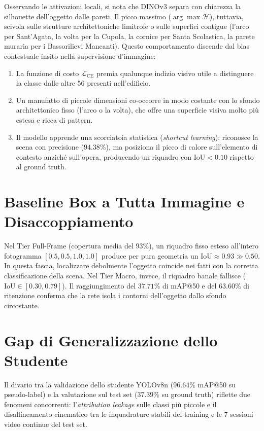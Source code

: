 Osservando le attivazioni locali, si nota che DINOv3 separa con chiarezza la silhouette dell'oggetto dalle pareti. Il picco massimo ($\arg\max \mathcal{H}$), tuttavia, scivola sulle strutture architettoniche limitrofe o sulle superfici contigue (l'arco per Sant'Agata, la volta per la Cupola, la cornice per Santa Scolastica, la parete muraria per i Bassorilievi Mancanti).
Questo comportamento discende dal bias contestuale insito nella supervisione d'immagine:
\begin{enumerate}
    \item La funzione di costo $\mathcal{L}_{\text{CE}}$ premia qualunque indizio visivo utile a distinguere la classe dalle altre 56 presenti nell'edificio.
    \item Un manufatto di piccole dimensioni co-occorre in modo costante con lo sfondo architettonico fisso (l'arco o la volta), che offre una superficie visiva molto più estesa e ricca di pattern.
    \item Il modello apprende una scorciatoia statistica (\textit{shortcut learning}): riconosce la scena con precisione ($94.38\%$), ma posiziona il picco di calore sull'elemento di contesto anziché sull'opera, producendo un riquadro con $\text{IoU} < 0.10$ rispetto al ground truth.
\end{enumerate}

\section{Baseline Box a Tutta Immagine e Disaccoppiamento}
\label{sec:ris_fullframe}
Nel Tier Full-Frame (copertura media del $93\%$), un riquadro fisso esteso all'intero fotogramma $[0.5, 0.5, 1.0, 1.0]$ produce per pura geometria un $\text{IoU} \approx 0.93 \gg 0.50$. In questa fascia, localizzare debolmente l'oggetto coincide nei fatti con la corretta classificazione della scena.
Nel Tier Macro, invece, il riquadro banale fallisce ($\text{IoU} \in [0.30, 0.79]$). Il raggiungimento del $37.71\%$ di mAP@50 e del $63.60\%$ di ritenzione conferma che la rete isola i contorni dell'oggetto dallo sfondo circostante.

\section{Gap di Generalizzazione dello Studente}
\label{sec:ris_distillazione_gap}
Il divario tra la validazione dello studente YOLOv8n ($96.64\%$ mAP@50 su pseudo-label) e la valutazione sul test set ($37.39\%$ su ground truth) riflette due fenomeni concorrenti: l'\textit{attribution leakage} sulle classi più piccole e il disallineamento cinematico tra le inquadrature stabili del training e le 7 sessioni video continue del test set.
